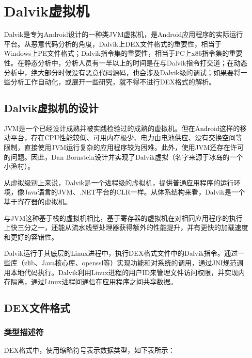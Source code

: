 \chapter{Dalvik虚拟机}
\label{Chap:dalvik}
Dalvik是专为Android设计的一种类JVM虚拟机，是Android应用程序的实际运行平台。从恶意代码分析的角度，Dalvik上DEX文件格式的重要性，相当于Windows上PE文件格式；Dalvik指令集的重要性，相当于PC上x86指令集的重要性。在静态分析中，分析人员有一半以上的时间是在与Dalvik指令打交道；在动态分析中，绝大部分时候没有恶意代码源码，也会涉及Dalvik级的调试；如果要将一些分析工作自动化，或展开一些研究，就不得不进行DEX格式的解析。

\section{Dalvik虚拟机的设计}
JVM是一个已经设计成熟并被实践检验过的成熟的虚拟机。但在Android这样的移动平台，存在CPU性能较低、可用内存极少、电力由电池供应、没有交换空间等限制，直接使用JVM运行复杂的应用程序较为困难。此外，使用JVM还存在许可的问题。因此，Dan Bornstein设计并实现了Dalvik虚拟（名字来源于冰岛的一个小渔村）。

从虚拟级别上来说，Dalvik是一个进程级的虚拟机，提供普通应用程序的运行环境，像Java语言的JVM、.NET平台的CLR一样。从体系结构来看，Dalvik是一个基于寄存器的虚拟机。

与JVM这种基于栈的虚拟机相比，基于寄存器的虚拟机在对相同应用程序的执行上快三分之一，还能从流水线型处理器获得额外的性能提升，并有更快的加载速度和更好的容错性\cite{dalvik_analysis}。

Dalvik运行于其底层的Linux进程中，执行DEX格式文件中的Dalvik指令。通过一些库（zlib、Java核心库、openssl等）实现功能和对系统的调用，通过JNI规范调用本地代码执行。Dalvik利用Linux进程的用户ID来管理文件访问权限，并实现内存隔离，通过Linux进程间通信在应用程序之间共享数据。
\section{DEX文件格式}
\subsection{类型描述符}
\label{SubSec:dalvik_data_type}
DEX格式中，使用缩略符号表示数据类型，如下表所示：

